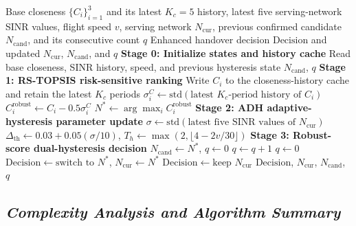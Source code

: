 \documentclass[10pt,a4paper]{article}
\begin{document}
\begin{algorithm}[H]
\caption{ALERA risk-aware vertical-handoff enhancement procedure}
\label{alg:alera}
\small
\begin{algorithmic}[1]
\Require Base closeness $\{C_i\}_{i=1}^{3}$ and its latest $K_c=5$ history, latest five serving-network SINR values, flight speed $v$, serving network $N_{\mathrm{cur}}$, previous confirmed candidate $N_{\mathrm{cand}}$, and its consecutive count $q$
\Ensure Enhanced handover decision $\mathrm{Decision}$ and updated $N_{\mathrm{cur}}$, $N_{\mathrm{cand}}$, and $q$
\State \textbf{Stage 0: Initialize states and history cache}
\State Read base closeness, SINR history, speed, and previous hysteresis state $N_{\mathrm{cand}}$, $q$
\State \textbf{Stage 1: RS-TOPSIS risk-sensitive ranking}
 \State Write $C_i$ to the closeness-history cache and retain the latest $K_c$ periods
 \State $\sigma_i^C\gets\mathrm{std}(\text{latest }K_c\text{-period history of }C_i)$
 \State $C_i^{\mathrm{robust}}\gets C_i-0.5\sigma_i^C$
\EndFor
\State $N^*\gets\arg\max_i C_i^{\mathrm{robust}}$
\State \textbf{Stage 2: ADH adaptive-hysteresis parameter update}
\State $\sigma\gets\mathrm{std}(\text{latest five SINR values of }N_{\mathrm{cur}})$
\State $\Delta_{\mathrm{th}}\gets0.03+0.05(\sigma/10)$, $T_h\gets\max(2,\lfloor4-2v/30\rfloor)$
\State \textbf{Stage 3: Robust-score dual-hysteresis decision}
 \State $N_{\mathrm{cand}}\gets N^*$, $q\gets0$
\EndIf
{}
 \State $q\gets q+1$
\Else
 \State $q\gets0$
\EndIf
{}
 \State $\mathrm{Decision}\gets\text{switch to }N^*$, $N_{\mathrm{cur}}\gets N^*$
\Else
 \State $\mathrm{Decision}\gets\text{keep }N_{\mathrm{cur}}$
\EndIf
\State \Return $\mathrm{Decision}$, $N_{\mathrm{cur}}$, $N_{\mathrm{cand}}$, $q$
\end{algorithmic}
\end{algorithm}

\subsection{\textmd{\textit{Complexity Analysis and Algorithm Summary}}}
\end{document}
